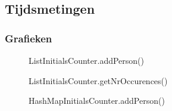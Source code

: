 \documentclass[10pt,a4paper]{report}
\begin{document}
\subsection*{Tijdsmetingen}

\subsubsection*{Grafieken}
\begin{figure}[h!]
    \centering
    \caption{ListInitialsCounter.addPerson()}
    \label{fig:LIC-aP}
\end{figure}
\begin{figure}[h!]
    \centering
    \caption{ListInitialsCounter.getNrOccurences()}
    \label{fig:LIC-gNO}
\end{figure}
\begin{figure}[h!]
    \centering
    \caption{HashMapInitialsCounter.addPerson()}
    \label{fig:HMIC-aP}
\end{figure}
\end{document}
